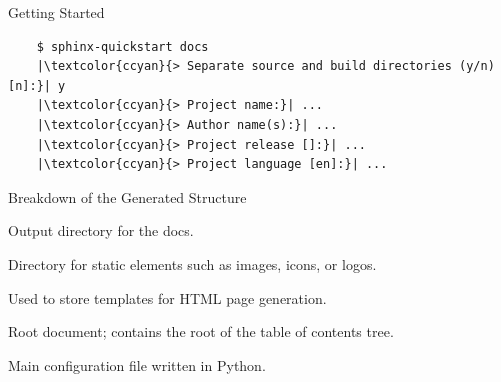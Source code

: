 \begin{frame}[fragile]{Getting Started}
  \begin{verbatim}
    $ sphinx-quickstart docs
    |\textcolor{ccyan}{> Separate source and build directories (y/n) [n]:}| y
    |\textcolor{ccyan}{> Project name:}| ...
    |\textcolor{ccyan}{> Author name(s):}| ...
    |\textcolor{ccyan}{> Project release []:}| ...
    |\textcolor{ccyan}{> Project language [en]:}| ...
  \end{verbatim}

  \begin{center}
  \pause
  \begin{minipage}{.45\textwidth}
  \end{minipage}
  \hfill
  \pause
  \begin{minipage}{.45\textwidth}
  \end{minipage}
  \end{center}
\end{frame}

{
\begin{frame}[fragile]{Breakdown of the Generated Structure}
  \begin{description}[labelwidth=\widthof{\faFolderOpen \texttt{\_templates}}]
    \setlength{\itemindent}{-4em}
    \item [\textcolor{dircolor}{\faFolderOpen} \texttt{build}:] Output directory for the docs.
    \item [\textcolor{dircolor}{\faFolderOpen} \texttt{\_static}:] Directory for static elements such as images, icons, or logos.
    \item [\textcolor{dircolor}{\faFolderOpen} \texttt{\_templates}:] Used to store 
      templates for HTML page generation. %
    \item [\faFile* \texttt{index.rst}:] Root document; contains the root of the table of contents tree.
    \item [\faPython \texttt{conf.py}:] Main configuration file written in Python.
  \end{description}
\end{frame}
}

